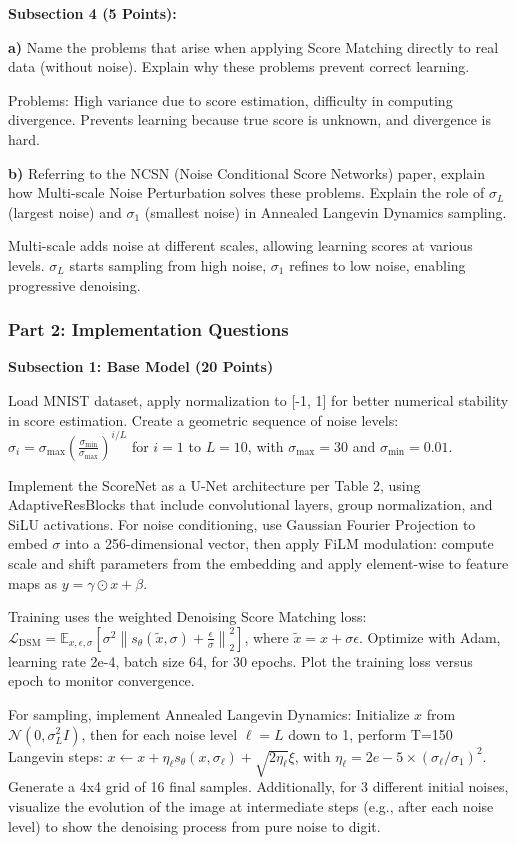 \documentclass[a4paper,12pt]{article}
\begin{document}
\textbf{Subsection 4 (5 Points):}

\textbf{a)} Name the problems that arise when applying Score Matching directly to real data (without noise). Explain why these problems prevent correct learning.

Problems: High variance due to score estimation, difficulty in computing divergence. Prevents learning because true score is unknown, and divergence is hard.

\textbf{b)} Referring to the NCSN (Noise Conditional Score Networks) paper, explain how Multi-scale Noise Perturbation solves these problems. Explain the role of $\sigma_L$ (largest noise) and $\sigma_1$ (smallest noise) in Annealed Langevin Dynamics sampling.

Multi-scale adds noise at different scales, allowing learning scores at various levels. $\sigma_L$ starts sampling from high noise, $\sigma_1$ refines to low noise, enabling progressive denoising.

\subsubsection{Part 2: Implementation Questions}

\textbf{Subsection 1: Base Model (20 Points)}

Load MNIST dataset, apply normalization to [-1, 1] for better numerical stability in score estimation. Create a geometric sequence of noise levels: $\sigma_i = \sigma_{\max} \left( \frac{\sigma_{\min}}{\sigma_{\max}} \right)^{i/L}$ for $i=1$ to $L=10$, with $\sigma_{\max}=30$ and $\sigma_{\min}=0.01$.

Implement the ScoreNet as a U-Net architecture per Table 2, using AdaptiveResBlocks that include convolutional layers, group normalization, and SiLU activations. For noise conditioning, use Gaussian Fourier Projection to embed $\sigma$ into a 256-dimensional vector, then apply FiLM modulation: compute scale and shift parameters from the embedding and apply element-wise to feature maps as $y = \gamma \odot x + \beta$.

Training uses the weighted Denoising Score Matching loss: $\mathcal{L}_{\text{DSM}} = \mathbb{E}_{x,\epsilon,\sigma} \left[ \sigma^2 \left\| s_\theta(\tilde{x}, \sigma) + \frac{\epsilon}{\sigma} \right\|_2^2 \right]$, where $\tilde{x} = x + \sigma \epsilon$. Optimize with Adam, learning rate 2e-4, batch size 64, for 30 epochs. Plot the training loss versus epoch to monitor convergence.

For sampling, implement Annealed Langevin Dynamics: Initialize $x$ from $\mathcal{N}(0, \sigma_L^2 I)$, then for each noise level $\ell = L$ down to 1, perform T=150 Langevin steps: $x \leftarrow x + \eta_\ell s_\theta(x, \sigma_\ell) + \sqrt{2\eta_\ell} \xi$, with $\eta_\ell = 2e-5 \times (\sigma_\ell / \sigma_1)^2$. Generate a 4x4 grid of 16 final samples. Additionally, for 3 different initial noises, visualize the evolution of the image at intermediate steps (e.g., after each noise level) to show the denoising process from pure noise to digit.
\end{document}

